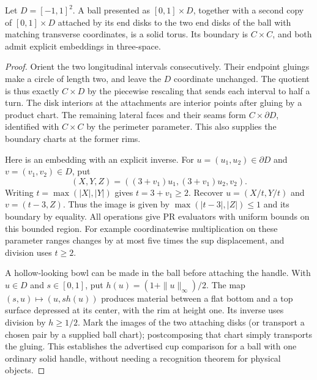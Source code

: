 \begin{proposition}\label{idx-ribbon35}
Let $D=[-1,1]^2$. A ball presented as $[0,1]\times D$, together with a second copy of $[0,1]\times D$ attached by its end disks to the two end disks of the ball with matching transverse coordinates, is a solid torus. Its boundary is $C\times C$, and both admit explicit embeddings in three-space.
\end{proposition}
\begin{proof}
Orient the two longitudinal intervals consecutively. Their endpoint gluings make a circle of length two, and leave the $D$ coordinate unchanged. The quotient is thus exactly $C\times D$ by the piecewise rescaling that sends each interval to half a turn. The disk interiors at the attachments are interior points after gluing by a product chart. The remaining lateral faces and their seams form $C\times\partial D$, identified with $C\times C$ by the perimeter parameter. This also supplies the boundary charts at the former rims.

Here is an embedding with an explicit inverse. For $u=(u_1,u_2)\in\partial D$ and $v=(v_1,v_2)\in D$, put
\[
      (X,Y,Z)=((3+v_1)u_1,(3+v_1)u_2,v_2).
\]
Writing $t=\max(|X|,|Y|)$ gives $t=3+v_1\ge2$. Recover $u=(X/t,Y/t)$ and $v=(t-3,Z)$. Thus the image is given by $\max(|t-3|,|Z|)\le1$ and its boundary by equality. All operations give PR evaluators with uniform bounds on this bounded region. For example coordinatewise multiplication on these parameter ranges changes by at most five times the sup displacement, and division uses $t\ge2$.

A hollow-looking bowl can be made in the ball before attaching the handle. With $u\in D$ and $s\in[0,1]$, put $h(u)=(1+\|u\|_\infty)/2$. The map $(s,u)\mapsto(u,s h(u))$ produces material between a flat bottom and a top surface depressed at its center, with the rim at height one. Its inverse uses division by $h\ge1/2$. Mark the images of the two attaching disks (or transport a chosen pair by a supplied ball chart); postcomposing that chart simply transports the gluing. This establishes the advertised cup comparison for a ball with one ordinary solid handle, without needing a recognition theorem for physical objects.
\end{proof}
